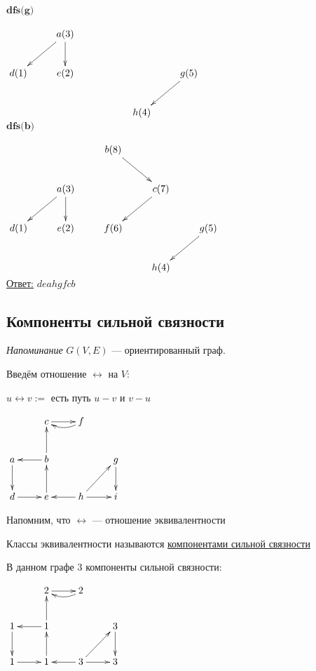 \documentclass[a4paper, 12pt] {article}
\begin{document}
$ \textbf{dfs(g)} $

$ \begin{matrix}
	\xymatrix{
		& a(3) \ar@{->}[d] \ar@{->}[ld] \\
		d(1) & e(2) & & & g(5) \ar@{->}[dl] \\
		& & & h(4)}
\end{matrix} $ \\

$ \textbf{dfs(b)} $

$ \begin{matrix}
	\xymatrix{
		& & b(8) \ar@{->}[rd] \\
		& a(3) \ar@{->}[d] \ar@{->}[ld] & & c(7) \ar@{->}[ld] \\
		d(1) & e(2) & f(6) & & g(5) \ar@{->}[dl] \\
		& & & h(4)}
\end{matrix} $ \\

\underline{Ответ:} $ deahgfcb $

\newpage

\subsection{Компоненты сильной связности}

\textit{Напоминание}
$ G(V, E) $ --- ориентированный граф. 

Введём отношение $ \leftrightarrow $ на $ V $:

$ u \leftrightarrow v :=  $ есть путь $ u-v $ и  $ v-u $

$ 
\begin{matrix}
	\xymatrix{
		& c \ar@{->}[r] & f \ar@/^/[l]\\
		a \ar@{->}[d] & b \ar@{->}[l] \ar@{->}[u] & & g \ar@{->}[d] \\
		d \ar@{->}[r] & e \ar@{->}[u] & h \ar@{->}[r] \ar@{->}[l] \ar@{->}[ru] & i
	}
\end{matrix} $

Напомним, что $ \leftrightarrow $ --- отношение эквивалентности

Классы эквивалентности называются \underline{компонентами сильной связности}

В данном графе 3 компоненты сильной связности:

$ 
\begin{matrix}
	\xymatrix{
		& 2 \ar@{->}[r] & 2 \ar@/^/[l]\\
		1 \ar@{->}[d] & 1 \ar@{->}[l] \ar@{->}[u] & & 3 \ar@{->}[d] \\
		1 \ar@{->}[r] & 1 \ar@{->}[u] & 3 \ar@{->}[r] \ar@{->}[l] \ar@{->}[ru] & 3
	}
\end{matrix} $\\
\end{document}
